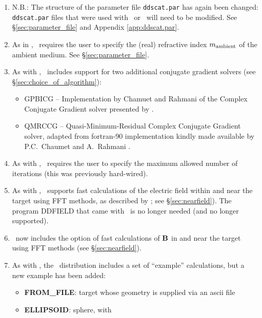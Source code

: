 \begin{enumerate}
\item N.B.: The structure of the parameter file {\tt ddscat.par} 
        has again been changed: {\tt ddscat.par} files that were used with 
	\ddscatsevenone\ or \ddscatseventwo\ will need to be modified.
	See \S\ref{sec:parameter_file} and Appendix \ref{app:ddscat.par}.
\item As in \ddscatseventwo, \ddscatseventhree\ requires the user to 
specify the (real) refractive
index $m_{\rm ambient}$ of the ambient medium.  See \S\ref{sec:parameter_file}.
\item As with \ddscatseventwo, \ddscatseventhree\ 
includes support for two additional conjugate
gradient solvers (see \S\ref{sec:choice_of_algorithm}):
\begin{itemize}
\item GPBICG -- Implementation by Chamuet and Rahmani of the Complex
                Conjugate Gradient solver presented by 
                \citet{Tang+Shen+Zheng+Qiu_2004}.
\item QMRCCG -- Quasi-Minimum-Residual Complex Conjugate Gradient solver,
                adapted from fortran-90 implementation kindly made available 
                by P.C.\ Chaumet and A.\ Rahmani
                \citep{Chaumet+Rahmani_2009}.
\end{itemize}
\item As with \ddscatseventwo, \ddscatseventhree\ requires the user to 
    specify the maximum
    allowed number of iterations (this was previously hard-wired).
\item As with \ddscatseventwo, \ddscatseventhree\ supports
    fast calculations of the electric field within and near
    the target
    using FFT methods, as described by
    \citet{Flatau+Draine_2012}; see \S\ref{sec:nearfield}).
    The program DDFIELD that came with \ddscatsevenone\ 
    is no longer needed (and no longer supported).
\item \ddscatseventhree\ now includes the option of fast calculations
    of ${\bf B}$ in and near the target using FFT methods
    (see \S\ref{sec:nearfield}).
\item As with \ddscatseventwo, 
    the \ddscatseventhree\ distribution includes a set of ``example''
    calculations, but a new example has been added:
\begin{itemize}
    \item {\bf FROM\_FILE}: target whose
          geometry is supplied via an ascii file
    \item {\bf ELLIPSOID}: sphere, with

\end{itemize}
\end{enumerate}
